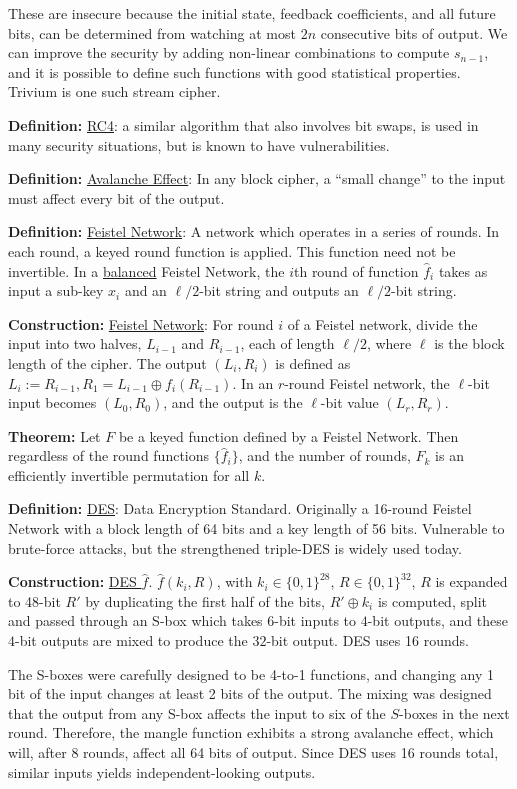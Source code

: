 \documentclass[10pt]{article}
\newcommand{\defn}[1]{{\bf Definition:} \underline{#1}}
\newcommand{\thm}[1]{{\bf Theorem:} \underline{#1}}
\newcommand{\con}[1]{{\bf Construction:} \underline{#1}}
\newcommand{\xor}{\oplus}
\begin{document}
\begin{multicols}{5}
These are insecure because the initial state, feedback coefficients, and all future bits, can be determined from watching at most $2n$ consecutive bits of output. We can improve the security by adding non-linear combinations to compute $s_{n-1}$, and it is possible to define such functions with good statistical properties. Trivium is one such stream cipher.

\defn{RC4}: a similar algorithm that also involves bit swaps, is used in many security situations, but is known to have vulnerabilities.

\defn{Avalanche Effect}: In any block cipher, a ``small change'' to the input must affect every bit of the output.

\defn{Feistel Network}: A network which operates in a series of rounds. In each round, a keyed round function is applied. This function need not be invertible. In a \underline{balanced} Feistel Network, the $i$th round of function $\hat{f}_i$ takes as input a sub-key $x_i$ and an $\ell/2$-bit string and outputs an $\ell/2$-bit string.

\con{Feistel Network}: For round $i$ of a Feistel network, divide the input into two halves, $L_{i-1}$ and $R_{i-1}$, each of length $\ell/2$, where $\ell$ is the block length of the cipher. The output $(L_i,R_i)$ is defined as $L_i:=R_{i-1}, R_1=L_{i-1}\xor f_i(R_{i-1})$. In an $r$-round Feistel network, the $\ell$-bit input becomes $(L_0,R_0)$, and the output is the $\ell$-bit value $(L_r,R_r)$.

\thm{}Let $F$ be a keyed function defined by a Feistel Network. Then regardless of the round functions $\{\hat{f}_i\}$, and the number of rounds, $F_k$ is an efficiently invertible permutation for all $k$.

\defn{DES}: Data Encryption Standard. Originally a 16-round Feistel Network with a block length of 64 bits and a key length of 56 bits. Vulnerable to brute-force attacks, but the strengthened triple-DES is widely used today.

\con{DES $\hat{f}$}. $\hat{f}(k_i,R)$, with $k_i\in\{0,1\}^{28}$, $R\in\{0,1\}^{32}$, $R$ is expanded to 48-bit $R'$ by duplicating the first half of the bits, $R'\xor k_i$ is computed, split and passed through an S-box which takes $6$-bit inputs to $4$-bit outputs, and these $4$-bit outputs are mixed to produce the $32$-bit output. DES uses 16 rounds.

The S-boxes were carefully designed to be 4-to-1 functions, and changing any 1 bit of the input changes at least 2 bits of the output. The mixing was designed that the output from any S-box affects the input to six of the $S$-boxes in the next round. Therefore, the mangle function exhibits a strong avalanche effect, which will, after 8 rounds, affect all 64 bits of output. Since DES uses 16 rounds total, similar inputs yields independent-looking outputs.


\end{multicols}
\end{document}
